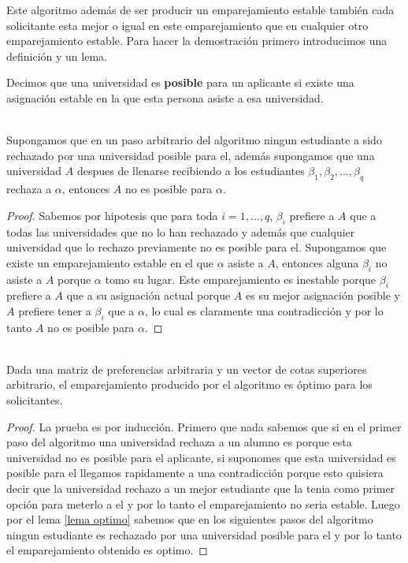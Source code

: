 Este algoritmo además de ser producir un emparejamiento estable también cada solicitante esta mejor o igual en este emparejamiento que en cualquier otro emparejamiento estable. Para hacer la demostración primero introducimos una definición y un lema. 

\begin{dfn}{\cite{GaleShapley}}
\label{Posible}
Decimos que una universidad es \textbf{posible} para un aplicante si existe una asignación estable en la que esta persona asiste a esa universidad.
\end{dfn}

\begin{lem} 
\label{lema optimo} 
\cite{GaleShapley} \\
Supongamos que en un paso arbitrario del algoritmo ningun estudiante a sido rechazado por una universidad posible para el, además supongamos que una universidad $A$ despues de llenarse recibiendo a los estudiantes $\beta_1,\beta_2,\dots,\beta_q$ rechaza a $\alpha$, entonces $A$ no es posible para $\alpha$.
\end{lem}
\begin{proof}
Sabemos por hipotesis que para toda $i=1,\dots,q$, $\beta_i$ prefiere a $A$ que a todas las universidades que no lo han rechazado y además que cualquier universidad que lo rechazo previamente no es posible para el. Supongamos que existe un emparejamiento estable en el que $\alpha$ asiste a $A$, entonces  alguna $\beta_i$ no asiste a $A$ porque $\alpha$ tomo su lugar. Este emparejamiento es inestable porque $\beta_i$ prefiere a $A$ que a su asignación actual porque $A$ es su mejor asignación posible y $A$ prefiere tener a $\beta_i$ que a $\alpha$, lo cual es claramente una contradicción y por lo tanto $A$ no es posible para $\alpha$.
\end{proof}

\begin{teo}
\label{optimo}
\cite{GaleShapley}  \\
Dada una matriz de preferencias arbitraria y un vector de cotas superiores arbitrario, el emparejamiento producido por el algoritmo es óptimo para los solicitantes.
\end{teo}
\begin{proof}
La prueba es por inducción. Primero que nada sabemos que si en el primer paso del algoritmo una universidad rechaza a un alumno es porque esta universidad no es posible para el aplicante, si suponomes que esta universidad es posible para el llegamos rapidamente a una contradicción porque esto quisiera decir que la universidad rechazo a un mejor estudiante que la tenia como primer opción para meterlo a el y por lo tanto el emparejamiento no seria estable. Luego por el lema \ref{lema optimo} sabemos que en los siguientes pasos del algoritmo ningun estudiante es rechazado por una universidad posible para el y por lo tanto el emparejamiento obtenido es optimo. 
\end{proof}


